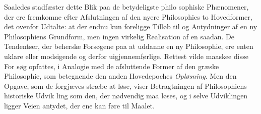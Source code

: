 Saaledes stadfæster dette Blik paa de betydeligste philo\-%
sophiske Phænomener, der ere fremkomne efter Afslutningen
af den nyere Philosophies to Hovedformer, det ovenfor Udtalte:
at der endnu kun foreligge Tilløb til og Antydninger af en
ny Philosophiens Grundform, men ingen virkelig Realisation af
en saadan. De Tendentser, der beherske Forsøgene paa at
uddanne en ny Philosophie, ere enten uklare eller modsigende
og derfor uigjennemførlige. Rettest vilde maaskee disse For\-%
søg opfattes, i Analogie med de afsluttende Former af den
græske Philosophie, som betegnende den anden Hovedepoches
\emph{Opløsning}. Men den Opgave, som de forgjæves stræbe at
løse, viser Betragtningen af Philosophiens historiske Udvik\-%
ling som den, der nødvendig maa løses, og i selve Udviklingen
ligger Veien antydet, der ene kan føre til Maalet.

